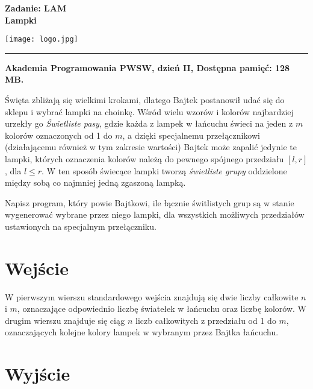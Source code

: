 \documentclass[10pt]{article}
\begin{document}
    

    \noindent
    \begin{minipage}{0.5\textwidth}
        \LARGE{\textsf{\textbf{Zadanie: LAM\\Lampki}}}
    \end{minipage}
    \begin{minipage}{0.5\textwidth}
        \begin{flushright}
            \texttt{[image: logo.jpg]}
        \end{flushright}
    \end{minipage}
    
    \noindent\rule{\textwidth}{0.4pt}
    
    \noindent\textbf{Akademia Programowania PWSW, dzień II, Dostępna pamięć: 128 MB.}
    \vspace{1em}
    
    
    \noindent
    Święta zbliżają się wielkimi krokami, dlatego Bajtek postanowił udać się do sklepu i wybrać lampki na choinkę. Wśród wielu wzorów i kolorów najbardziej urzekły go \textit{Świetliste pasy}, gdzie każda z lampek w łańcuchu świeci na jeden z $m$ kolorów oznaczonych od 1 do $m$, a dzięki specjalnemu przełącznikowi (działającemu również w tym zakresie wartości) Bajtek może zapalić jedynie te lampki, których oznaczenia kolorów należą do pewnego spójnego przedziału $[l, r]$, dla $l \leq r$. W ten sposób świecące lampki tworzą \textit{świetliste grupy} oddzielone między sobą co najmniej jedną zgaszoną lampką.

    Napisz program, który powie Bajtkowi, ile łącznie świtlistych grup są w stanie wygenerować wybrane przez niego lampki, dla wszystkich możliwych przedziałów ustawionych na specjalnym przełączniku.


    \section*{Wejście}
    
    W pierwszym wierszu standardowego wejścia znajdują się dwie liczby całkowite $n$ i $m$, oznaczające odpowiednio liczbę światełek w łańcuchu oraz liczbę kolorów. W drugim wierszu znajduje się ciąg $n$ liczb całkowitych z przedziału od 1 do $m$, oznaczających kolejne kolory lampek w wybranym przez Bajtka łańcuchu.


    \section*{Wyjście}
    
\end{document}
